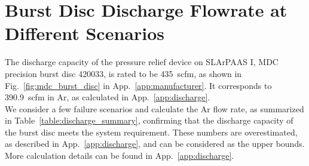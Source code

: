 \section{Burst Disc Discharge Flowrate at Different Scenarios}
\label{sec:discharge_rate}

The discharge capacity of the pressure relief device on SLArPAAS I,
MDC precision burst disc 420033, is rated to be 435~scfm,
as shown in Fig.~\ref{fig:mdc_burst_disc} in App.~\ref{app:manufacturer}.
It corresponds to 390.9~scfm in Ar, as calculated in App.~\ref{app:discharge}.\\

We consider a few failure scenarios and calculate the Ar flow rate,
as summarized in Table~\ref{table:discharge_summary},
confirming that the discharge capacity of the burst disc meets the
system requirement.
These numbers are overestimated, as described in App.~\ref{app:discharge},
and can be considered as the upper bounds.
More calculation details can be found in App.~\ref{app:discharge}.


